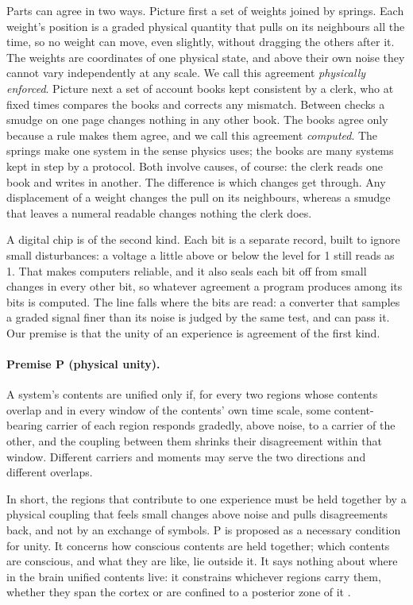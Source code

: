 \documentclass[12pt]{article}
\begin{document}
Parts can agree in two ways. Picture first a set of weights joined by springs.
Each weight's position is a graded physical quantity that pulls on its
neighbours all the time, so no weight can move, even slightly, without dragging
the others after it. The weights are coordinates of one physical state, and above
their own noise they cannot vary independently at any scale. We call this
agreement \emph{physically enforced}. Picture next a set of account books kept
consistent by a clerk, who at fixed times compares the books and corrects any
mismatch. Between checks a smudge on one page changes nothing in any other book.
The books agree only because a rule makes them agree, and we call this
agreement \emph{computed}. The springs make one system in the sense physics
uses; the books are many systems kept in step by a protocol. Both involve
causes, of course: the clerk reads one book and writes in another. The
difference is which changes get through. Any displacement of a weight changes
the pull on its neighbours, whereas a smudge that leaves a numeral readable
changes nothing the clerk does.

A digital chip is of the second kind. Each bit is a separate record, built to
ignore small disturbances: a voltage a little above or below the level for 1
still reads as 1. That makes computers reliable, and it also seals each bit off
from small changes in every other bit, so whatever agreement a program produces
among its bits is computed. The line falls where the bits are read: a converter
that samples a graded signal finer than its noise is judged by the same test,
and can pass it. Our premise is that
the unity of an experience is agreement of the first kind.

\paragraph{Premise P (physical unity).} A system's contents are unified only if,
for every two regions whose contents overlap and in every window of the
contents' own time scale, some content-bearing carrier of each region responds
gradedly, above noise, to a carrier of the other, and the coupling between them
shrinks their disagreement within that window. Different carriers and moments
may serve the two directions and different overlaps.

In short, the regions that contribute to one experience must be held together
by a physical coupling that feels small changes above noise and pulls
disagreements back, and not by an exchange of symbols. P is proposed as a
necessary condition for unity. It concerns how conscious contents are held
together; which contents are conscious, and what they are like, lie outside
it. It says nothing
about where in the brain unified contents live: it constrains whichever regions
carry them, whether they span the cortex or are confined to a posterior zone of
it \citep{koch2016}.
\end{document}
